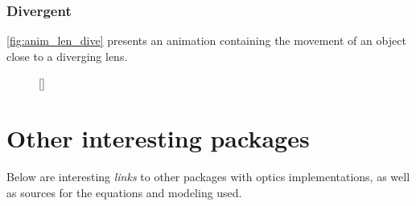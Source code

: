 \documentclass[a4paper,10pt]{article}
\begin{document}
\subsubsection{Divergent}

\autoref{fig:anim_len_dive} presents an animation containing the movement of an object close to a diverging lens.

\begin{figure}[!ht]
  \centering
  [\linewidth]{
  }
\end{figure}

\section{Other interesting packages}

Below are interesting \textit{links} to other packages with optics implementations, as well as sources for the equations and modeling used.
\end{document}
